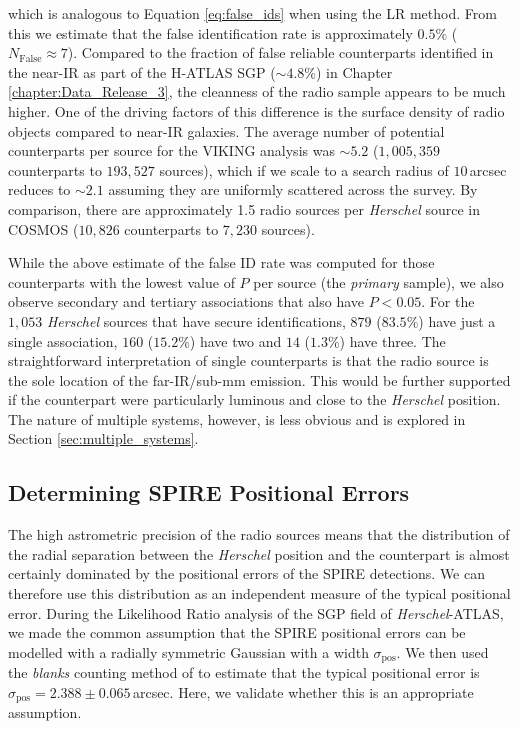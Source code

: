 \noindent which is analogous to Equation \ref{eq:false_ids} when using the LR method. From this we estimate that the false identification rate is approximately $0.5\%$ ($N_\textrm{False} \approx 7$). Compared to the fraction of false reliable counterparts identified in the near-IR as part of the H-ATLAS SGP ($\sim 4.8\%$) in Chapter \ref{chapter:Data_Release_3}, the cleanness of the radio sample appears to be much higher. One of the driving factors of this difference is the surface density of radio objects compared to near-IR galaxies. The average number of potential counterparts per source for the VIKING analysis was $\sim 5.2$ ($1,005,359$ counterparts to $193,527$ sources), which if we scale to a search radius of $10\,$arcsec reduces to $\sim 2.1$ assuming they are uniformly scattered across the survey. By comparison, there are approximately 1.5 radio sources per \textit{Herschel} source in COSMOS ($10,826$ counterparts to $7,230$ sources).

While the above estimate of the false ID rate was computed for those counterparts with the lowest value of $P$ per source (the \textit{primary} sample), we also observe secondary and tertiary associations that also have $P < 0.05$. For the $1,053$ \textit{Herschel} sources that have secure identifications, $879$ ($83.5\%$) have just a single association, $160$ ($15.2\%$) have two and $14$ ($1.3\%$) have three. The straightforward interpretation of single counterparts is that the radio source is the sole location of the far-IR/sub-mm emission. This would be further supported if the counterpart were particularly luminous and close to the \textit{Herschel} position. The nature of multiple systems, however, is less obvious and is explored in Section \ref{sec:multiple_systems}.

\subsection{Determining SPIRE Positional Errors}

The high astrometric precision of the radio sources means that the distribution of the radial separation between the \textit{Herschel} position and the counterpart is almost certainly dominated by the positional errors of the SPIRE detections. We can therefore use this distribution as an independent measure of the typical positional error. During the Likelihood Ratio analysis of the SGP field of \textit{Herschel}-ATLAS, we made the common assumption that the SPIRE positional errors can be modelled with a radially symmetric Gaussian with a width $\sigma_\textrm{pos}$. We then used the \textit{blanks} counting method of \citealt{Fleuren_2012} to estimate that the typical positional error is $\sigma_\textrm{pos} = 2.388\pm0.065\,$arcsec. Here, we validate whether this is an appropriate assumption.

